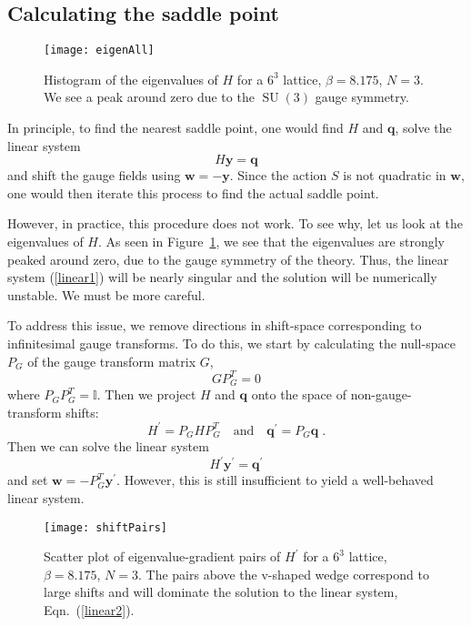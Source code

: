 \documentclass[preprint,aps,prd]{revtex4-2}
\newcommand{\be}{\begin{equation}}
\newcommand{\eq}{\end{equation}}
\DeclareMathOperator{\SU}{SU}
\begin{document}
\subsection{Calculating the saddle point}
\label{saddle}

\begin{figure}
\texttt{[image: eigenAll]}
\caption{Histogram of the eigenvalues of $H$ for a $6^3$ lattice,
  $\beta = 8.175$, $N=3$.  We see a peak around zero due to the
  $\SU(3)$ gauge symmetry.
  \label{eigenAll}}
\end{figure}

In principle, to find the nearest saddle point, one would
find $H$ and $\mathbf{q}$, solve the linear system
\be
    H \mathbf{y} = \mathbf{q} \label{linear1}
\eq
and shift the gauge fields using $\mathbf{w} = -\mathbf{y}$.
Since the action $S$ is not quadratic in $\mathbf{w}$, one
would then iterate this process to find the actual saddle point.

However, in practice, this procedure does not work.  To see why, let us
look at the eigenvalues of $H$.  As seen in Figure~\ref{eigenAll},
we see that the eigenvalues are strongly peaked around zero,
due to the gauge symmetry of the theory.  Thus, the linear
system (\ref{linear1}) will be nearly singular and
the solution will be numerically unstable.  We must be more careful.

To address this issue, we remove directions in shift-space corresponding
to infinitesimal gauge transforms.  To do this, we start
by calculating the null-space $P_G$ of the gauge transform matrix $G$,
\be
G P_G^T = 0
\eq
where $P_G P_G^T = \mathbb{I}$.  Then we project $H$ and $\mathbf{q}$ onto
the space of non-gauge-transform shifts:
\be
         H^\prime = P_G H P_G^T \quad \mbox{and} \quad
         \mathbf{q}^\prime = P_G \mathbf{q} \; .
\eq
Then we can solve the linear system
\be
   H^\prime \mathbf{y}^\prime = \mathbf{q}^\prime \label{linear2}
\eq
and set $\mathbf{w} = - P_G^T \mathbf{y}^\prime$.  However, this is
still insufficient to yield a well-behaved linear system.

\begin{figure}
\texttt{[image: shiftPairs]}
\caption{Scatter plot of eigenvalue-gradient pairs of $H^\prime$
  for a $6^3$ lattice, $\beta = 8.175$, $N=3$.  The pairs above the
  v-shaped wedge correspond to large shifts and will dominate
  the solution to the linear system, Eqn.~(\ref{linear2}).
  \label{shiftPairs}}
\end{figure}
\end{document}
